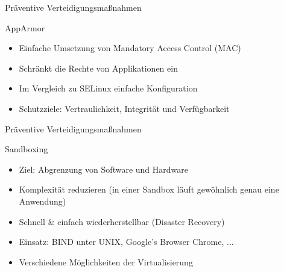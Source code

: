 \begin{frame}{Präventive Verteidigungsmaßnahmen}
        \begin{block}{AppArmor}
                \begin{itemize}[<+->]
                        \item Einfache Umsetzung von Mandatory Access Control (MAC)
                        \item Schränkt die Rechte von Applikationen ein
                        \item Im Vergleich zu SELinux einfache Konfiguration
                        \item Schutzziele: Vertraulichkeit, Integrität und Verfügbarkeit
                \end{itemize}
        \end{block}
\end{frame}

\begin{frame}{Präventive Verteidigungsmaßnahmen}
        \begin{block}{Sandboxing}
                \begin{itemize}[<+->]
                        \item Ziel: Abgrenzung von Software und Hardware
                        \item Komplexität reduzieren (in einer Sandbox läuft gewöhnlich genau eine Anwendung)
                        \item Schnell \& einfach wiederherstellbar (Disaster Recovery)
                        \item Einsatz: BIND unter UNIX, Google's Browser Chrome, ...
                        \item Verschiedene Möglichkeiten der Virtualisierung
                \end{itemize}
        \end{block}
\end{frame}

